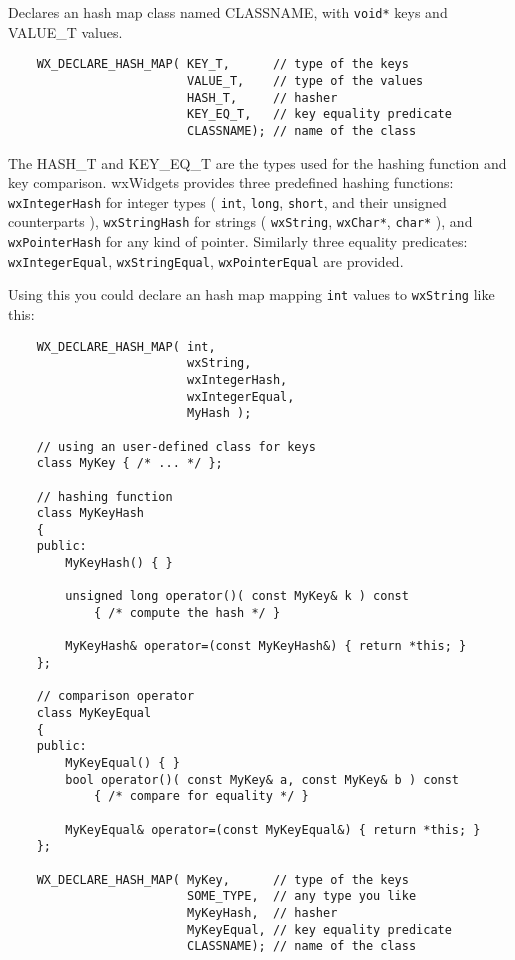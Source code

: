 Declares an hash map class named CLASSNAME, with {\tt void*} keys
and VALUE\_T values.

\begin{verbatim}
    WX_DECLARE_HASH_MAP( KEY_T,      // type of the keys
                         VALUE_T,    // type of the values
                         HASH_T,     // hasher
                         KEY_EQ_T,   // key equality predicate
                         CLASSNAME); // name of the class
\end{verbatim}

The HASH\_T and KEY\_EQ\_T are the types
used for the hashing function and key comparison. wxWidgets provides
three predefined hashing functions: {\tt wxIntegerHash}
for integer types ( {\tt int}, {\tt long}, {\tt short},
and their unsigned counterparts ), {\tt wxStringHash} for strings
( {\tt wxString}, {\tt wxChar*}, {\tt char*} ), and
{\tt wxPointerHash} for any kind of pointer.
Similarly three equality predicates:
{\tt wxIntegerEqual}, {\tt wxStringEqual}, {\tt wxPointerEqual} are provided.

Using this you could declare an hash map mapping {\tt int} values
to {\tt wxString} like this:

\begin{verbatim}
    WX_DECLARE_HASH_MAP( int,
                         wxString,
                         wxIntegerHash,
                         wxIntegerEqual,
                         MyHash );

    // using an user-defined class for keys
    class MyKey { /* ... */ };

    // hashing function
    class MyKeyHash
    {
    public:
        MyKeyHash() { }

        unsigned long operator()( const MyKey& k ) const
            { /* compute the hash */ }

        MyKeyHash& operator=(const MyKeyHash&) { return *this; }
    };

    // comparison operator
    class MyKeyEqual
    {
    public:
        MyKeyEqual() { }
        bool operator()( const MyKey& a, const MyKey& b ) const
            { /* compare for equality */ }

        MyKeyEqual& operator=(const MyKeyEqual&) { return *this; }
    };

    WX_DECLARE_HASH_MAP( MyKey,      // type of the keys
                         SOME_TYPE,  // any type you like
                         MyKeyHash,  // hasher
                         MyKeyEqual, // key equality predicate
                         CLASSNAME); // name of the class
\end{verbatim}

